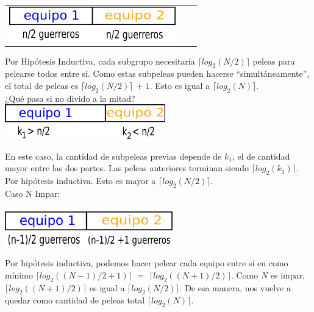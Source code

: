         {\begin{tabular}{ccc}
         \includegraphics[height=1.5cm]{graficos/kaioken1.png} 

          \end{tabular}}

        Por Hipótesis Inductiva, cada subgrupo necesitaría $\lceil log_{2}(N/2) \rceil$ peleas para pelearse todos entre sí. Como estas subpeleas pueden hacerse “simultáneamente”, el total de peleas es $\lceil log_{2}(N/2) \rceil$ $+$ $1$. Esto es igual a $\lceil log_{2}(N) \rceil$. \\

        ¿Qué pasa si no divido a la mitad?\\


         \includegraphics[height=1.5cm]{graficos/kaioken2.png} 
        
        

        En este caso, la cantidad de subpeleas previas depende de $k_{1}$, el de cantidad mayor entre las dos partes. Las peleas anteriores terminan siendo $\lceil log_{2}(k_{1}) \rceil$. Por hipótesis inductiva. Esto es mayor a $\lceil log_{2}(N/2) \rceil$. \\

        Caso N Impar: \\
        \\

         \includegraphics[height=1.5cm]{graficos/kaioken3.png} 
        
        

        Por hipótesis inductiva, podemos hacer pelear cada equipo entre sí en como mínimo $\lceil log_{2}((N-1)/2+1) \rceil$ $=$ $\lceil log_{2}((N+1)/2) \rceil$. Como $N$ es impar, $\lceil log_{2}((N+1)/2) \rceil$ es igual a $\lceil log_{2}(N/2) \rceil$. De esa manera, nos vuelve a quedar como cantidad de peleas total $\lceil log_{2}(N) \rceil$. \\

